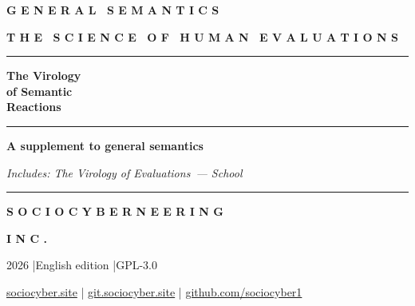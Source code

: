 \documentclass[13pt,a4paper]{article}
\begin{document}
\thispagestyle{empty}
\begin{titlepage}
\centering
\vspace*{3cm}

{\montserrat\bfseries\small{}\color{sce-black}
G E N E R A L \ S E M A N T I C S}

\vspace{0.4em}
{\montserrat\bfseries\footnotesize{}\color{sce-black}
T H E \ S C I E N C E \ O F \ H U M A N \ E V A L U A T I O N S}

\vspace{1.8em}
\textcolor{sce-gold}{\rule{0.4\textwidth}{0.6pt}}
\vspace{1.2em}

{\montserrat\fontsize{32}{38}\selectfont\bfseries\color{sce-black}
The Virology\\[0.2em]
of Semantic\\[0.2em]
Reactions}

\vspace{1.4em}
\textcolor{sce-gold}{\rule{0.3\textwidth}{0.4pt}}
\vspace{1.6em}

{\montserrat\bfseries\normalsize{}\color{sce-black}
A supplement to general semantics}

\vspace{0.5em}
{\small\color{sce-black}\itshape
Includes: The Virology of Evaluations~--- School}

\vfill

\textcolor{sce-gold}{\rule{0.5\textwidth}{0.3pt}}
\vspace{0.8em}

{\montserrat\bfseries\small{}\color{sce-black}
S O C I O C Y B E R N E E R I N G}

\vspace{0.2em}
{\montserrat\bfseries\footnotesize{}\color{sce-black}
I N C .}

\vspace{0.6em}
{\small\color{sce-black} 2026 \quad|\quad English edition \quad|\quad GPL-3.0}

\vspace{0.4em}
{\footnotesize\color{sce-black}
\href{https://sociocyber.site}{sociocyber.site} \quad|\quad
\href{https://git.sociocyber.site}{git.sociocyber.site} \quad|\quad
\href{https://github.com/sociocyber1}{github.com/sociocyber1}}

\end{titlepage}
\end{document}
